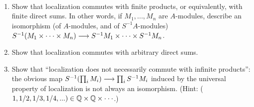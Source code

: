 \documentclass[11pt]{book} %
\begin{document}
\begin{exr}\ 
\begin{enumerate}[label=(\alph*)]
\item Show that localization commutes with finite products, or equivalently, with
finite direct sums. In other words, if $M_1,...,M_n$ are $A$-modules, describe an isomorphism (of $A$-modules, and of $S^{-1}A$-modules) $S^{-1}(M_1 \times\cdot\cdot\cdot\times M_n) \longrightarrow S^{-1}M_1 \times
\cdot\cdot \cdot\times S^{-1}M_n$.
\item  Show that localization commutes with arbitrary direct sums.
\item Show that “localization does not necessarily commute with infinite products”:
the obvious map $S^{-1}(\prod_i M_i) \longrightarrow  \prod_i S^{-1}M_i$ induced by the universal property of
localization is not always an isomorphism. (Hint: ($1, 1/2, 1/3, 1/4,... ) \in \mathbb Q\times\mathbb Q \times \cdot\cdot\cdot$.)
\end{enumerate}
\end{exr}
\end{document}
